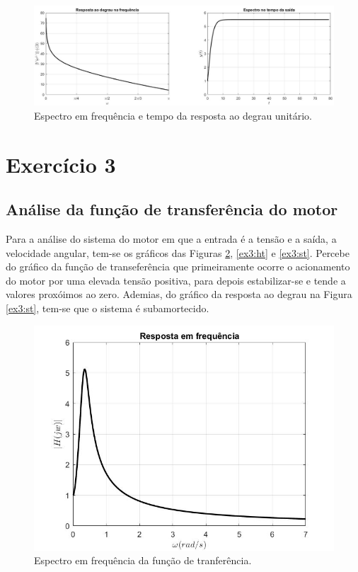 \documentclass[a4paper,12pt,oneside,openany,table,xcdraw]{article}
\begin{document}
\vspace{0.3cm}
\begin{figure}[H]
\centering
\includegraphics[width=15.8cm]{ex2-u}
\caption{Espectro em frequência e tempo da resposta ao degrau unitário.}
\label{ex2:u}
\end{figure}

\vspace{0.5cm}
\section{Exercício 3}
\subsection{Análise da função de transferência do motor}
Para a análise do sistema do motor em que a entrada é a tensão e a saída, a velocidade angular, tem-se os gráficos das Figuras \ref{ex3:Hjw}, \ref{ex3:ht} e \ref{ex3:st}. Percebe do gráfico da função de transeferência que primeiramente ocorre o acionamento do motor por uma elevada tensão positiva, para depois estabilizar-se e tende a valores proxóimos ao zero. Ademias, do gráfico da resposta ao degrau na Figura \ref{ex3:st}, tem-se que o sistema é subamortecido.

\vspace{0.2cm}
\begin{figure}[H]
\centering
\includegraphics[width=14cm]{ex3-Hjw}
\caption{Espectro em frequência da função de tranferência.}
\label{ex3:Hjw}
\end{figure}
\end{document}
